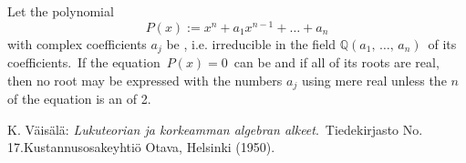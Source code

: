\documentclass[12pt]{article}
\theoremstyle{definition}
\begin{document}

Let the polynomial
$$P(x) := x^n+a_1x^{n-1}+\ldots+a_n$$
with complex coefficients $a_j$ be , i.e. irreducible in the field  $\mathbb{Q}(a_1,\,\ldots,\,a_n)$\, of its coefficients.\, If the equation \,$P(x) = 0$\, can be  and if all of its roots are real, then no root may be expressed with the numbers $a_j$ using mere real  unless the  $n$ of the equation is an  of 2.

\begin{thebibliography}{9}
 {\sc K. V\"ais\"al\"a}: {\em Lukuteorian ja korkeamman algebran alkeet}.\, Tiedekirjasto No. 17.\quad  Kustannusosakeyhti\"o Otava, Helsinki (1950).
\end{thebibliography}
\end{document}
